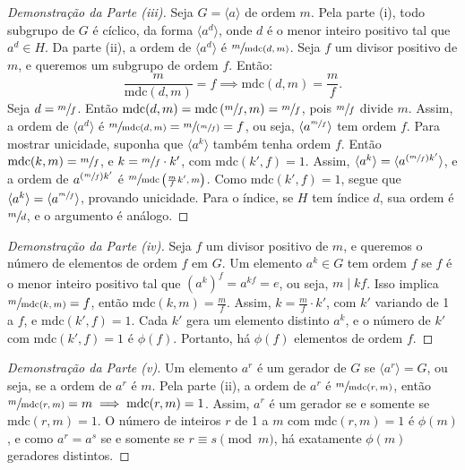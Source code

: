 \begin{proof}[Demonstração da Parte (iii)]
  Seja $G = \langle a \rangle$ de ordem $m$. Pela parte (i), todo subgrupo de $G$
  é cíclico, da forma $\langle a^d \rangle$, onde $d$ é o menor inteiro
  positivo tal que $a^d \in H$. Da parte (ii), a ordem de $\langle a^d \rangle$
  é $\sfrac{m}{\text{mdc}(d, m)}$. Seja $f$ um divisor positivo de $m$, e
  queremos um subgrupo de ordem $f$. Então:
  \[
  \frac{m}{\text{mdc}(d, m)} = f \implies \text{mdc}(d, m) = \frac{m}{f}.
  \]
  Seja $d = \sfrac{m}{f}$. Então $\text{mdc}(d, m) = \text{mdc}\left(\sfrac{m}{f},
  m\right) = \sfrac{m}{f}$, pois $\sfrac{m}{f}$ divide $m$. Assim, a ordem de
  $\langle a^d \rangle$ é $\sfrac{m}{\text{mdc}(d, m)} = \sfrac{m}{(\sfrac{m}{f})} =
  f$, ou seja, $\langle a^{\sfrac{m}{f}} \rangle$ tem ordem $f$. Para mostrar
  unicidade, suponha que $\langle a^k \rangle$ também tenha ordem $f$. Então
  $\text{mdc}(k, m) = \sfrac{m}{f}$, e $k = \sfrac{m}{f} \cdot k'$, com
  $\text{mdc}(k', f) = 1$. Assim, $\langle a^k \rangle = \langle a^{(\sfrac{m}{f})
  k'} \rangle$, e a ordem de $a^{(\sfrac{m}{f}) k'}$ é
  $\sfrac{m}{\text{mdc}\left(\frac{m}{f} k', m\right)}$. Como $\text{mdc}(k', f)
  = 1$, segue que $\langle a^k \rangle = \langle a^{\sfrac{m}{f}} \rangle$,
  provando unicidade. Para o índice, se $H$ tem índice $d$, sua ordem é
  $\sfrac{m}{d}$, e o argumento é análogo.
\end{proof}

\begin{proof}[Demonstração da Parte (iv)]
  Seja $f$ um divisor positivo de $m$, e queremos o número de elementos de ordem
  $f$ em $G$. Um elemento $a^k \in G$ tem ordem $f$ se $f$ é o menor inteiro
  positivo tal que $(a^k)^f = a^{kf} = e$, ou seja, $m \mid kf$. Isso implica
  $\sfrac{m}{\text{mdc}(k, m)} = f$, então $\text{mdc}(k, m) = \frac{m}{f}$.
  Assim, $k = \frac{m}{f} \cdot k'$, com $k'$ variando de 1 a $f$, e
  $\text{mdc}(k', f) = 1$. Cada $k'$ gera um elemento distinto $a^k$, e o
  número de $k'$ com $\text{mdc}(k', f) = 1$ é $\phi(f)$. Portanto, há
  $\phi(f)$ elementos de ordem $f$.
\end{proof}

\begin{proof}[Demonstração da Parte (v)]
  Um elemento $a^r$ é um gerador de $G$ se $\langle a^r \rangle = G$, ou seja, se
  a ordem de $a^r$ é $m$. Pela parte (ii), a ordem de $a^r$ é
  $\sfrac{m}{\text{mdc}(r, m)}$, então $\sfrac{m}{\text{mdc}(r, m)} = m \implies
  \text{mdc}(r, m) = 1$. Assim, $a^r$ é um gerador se e somente se
  $\text{mdc}(r, m) = 1$. O número de inteiros $r$ de 1 a $m$ com
  $\text{mdc}(r, m) = 1$ é $\phi(m)$, e como $a^r = a^s$ se e somente se $r
  \equiv s \pmod{m}$, há exatamente $\phi(m)$ geradores distintos. 
\end{proof}


